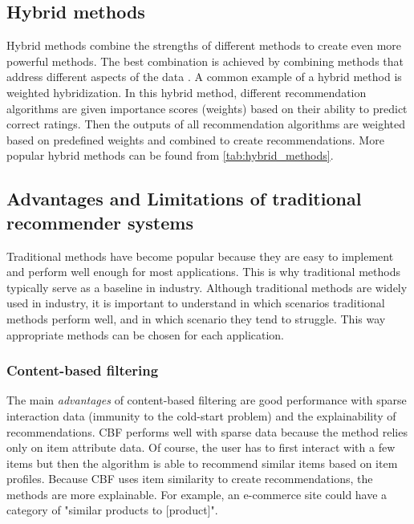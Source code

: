 \documentclass[english, 12pt, a4paper, sci, utf8, a-2b, online]{aaltothesis}
\begin{document}
\subsection{Hybrid methods}
\label{subsec:hybrid_method}

Hybrid methods combine the strengths of different methods to create even more powerful methods. The best combination is achieved by combining methods that address different aspects of the data \parencite{bell2007lessons}. A common example of a hybrid method is weighted hybridization. In this hybrid method, different recommendation algorithms are given importance scores (weights) based on their ability to predict correct ratings. Then the outputs of all recommendation algorithms are weighted based on predefined weights and combined to create recommendations. More popular hybrid methods can be found from \autoref{tab:hybrid_methods}.



\subsection{Advantages and Limitations of traditional recommender systems}

Traditional methods have become popular because they are easy to implement and perform well enough for most applications. This is why traditional methods typically serve as a baseline in industry. Although traditional methods are widely used in industry, it is important to understand in which scenarios traditional methods perform well, and in which scenario they tend to struggle. This way appropriate methods can be chosen for each application.

\subsubsection{Content-based filtering}

The main \textit{advantages} of content-based filtering are good performance with sparse interaction data (immunity to the cold-start problem) \parencite{al2024traditional} and the explainability of recommendations. CBF performs well with sparse data because the method relies only on item attribute data. Of course, the user has to first interact with a few items but then the  algorithm is able to recommend similar items based on item profiles. Because CBF uses item similarity to create recommendations, the methods are more explainable. For example, an e-commerce site could have a category of "similar products to [product]". 
\end{document}
